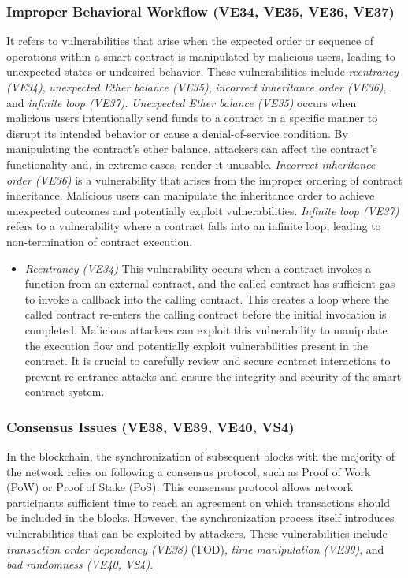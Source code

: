 \documentclass[manuscript,screen]{acmart}
\begin{document}
\subsubsection{Improper Behavioral Workflow (VE34, VE35, VE36, VE37)} 
It refers to vulnerabilities that arise when the expected order or sequence of operations within a smart contract is manipulated by malicious users, leading to unexpected states or undesired behavior. These vulnerabilities include \textit{reentrancy (VE34)}, \textit{unexpected Ether balance (VE35)}, \textit{incorrect inheritance order (VE36)}, and \textit{infinite loop (VE37)}.
\textit{Unexpected Ether balance (VE35)} occurs when malicious users intentionally send funds to a contract in a specific manner to disrupt its intended behavior or cause a denial-of-service condition. By manipulating the contract's ether balance, attackers can affect the contract's functionality and, in extreme cases, render it unusable. \textit{Incorrect inheritance order (VE36)} is a vulnerability that arises from the improper ordering of contract inheritance. Malicious users can manipulate the inheritance order to achieve unexpected outcomes and potentially exploit vulnerabilities. \textit{Infinite loop (VE37)} refers to a vulnerability where a contract falls into an infinite loop, leading to non-termination of contract execution. 

\begin{itemize}
  \item \textit{Reentrancy (VE34)} This vulnerability occurs when a contract invokes a function from an external contract, and the called contract has sufficient gas to invoke a callback into the calling contract. This creates a loop where the called contract re-enters the calling contract before the initial invocation is completed. Malicious attackers can exploit this vulnerability to manipulate the execution flow and potentially exploit vulnerabilities present in the contract. It is crucial to carefully review and secure contract interactions to prevent re-entrance attacks and ensure the integrity and security of the smart contract system. 
\end{itemize}


\subsubsection{Consensus Issues (VE38, VE39, VE40, VS4)} In the blockchain, the synchronization of subsequent blocks with the majority of the network relies on following a consensus protocol, such as Proof of Work (PoW) or Proof of Stake (PoS). This consensus protocol allows network participants sufficient time to reach an agreement on which transactions should be included in the blocks. However, the synchronization process itself introduces vulnerabilities that can be exploited by attackers. These vulnerabilities include \textit{transaction order dependency (VE38)} (TOD), \textit{time manipulation (VE39)}, and \textit{bad randomness (VE40, VS4)}.
\end{document}
